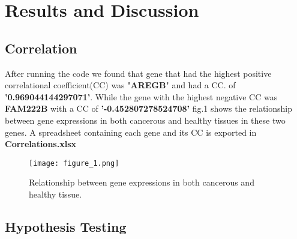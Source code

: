 \documentclass[conference,twocolumn]{IEEEtran}
\begin{document}
\section{Results and Discussion}
\subsection{Correlation}
After running the code we found that gene that had the highest positive correlational coefficient(CC) was "\textbf{AREGB}" and had a CC. of \textbf{'0.969044144297071'}. While the gene with the highest negative CC was \textbf{FAM222B} with a CC of \textbf{'-0.452807278524708'} fig.1 shows the relationship between gene expressions in both cancerous and healthy tissues in these two genes. A spreadsheet containing each gene and its CC is exported in \textbf{Correlations.xlsx}
\begin{figure}[H]
    \centering
    \texttt{[image: figure\_1.png]}
    \caption{Relationship between gene expressions in both cancerous and healthy tissue.}
    \label{fig:my_label}
\end{figure}
\subsection{Hypothesis Testing}
\end{document}
